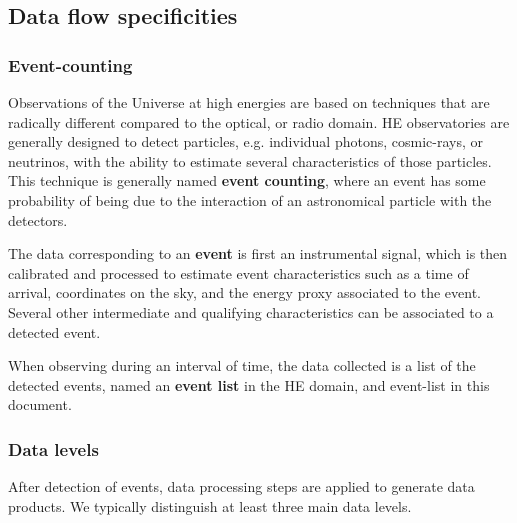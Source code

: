 \documentclass[11pt,a4paper]{ivoa}
\begin{document}
\subsection{Data flow specificities}

\subsubsection{Event-counting}

Observations of the Universe at high energies are based on techniques that are radically different compared to the optical, or radio domain. HE observatories are generally designed to detect particles, e.g. individual photons, cosmic-rays, or neutrinos, with the ability to estimate several characteristics of those particles. This technique is generally named \textbf{event counting}, where an event has some probability of being due to the interaction of an astronomical particle with the detectors.

The data corresponding to an \textbf{event} is first an instrumental signal, which is then calibrated and processed to estimate event characteristics such as a time of arrival, coordinates on the sky, and the energy proxy associated to the event. Several other intermediate and qualifying characteristics can be associated to a detected event.

When observing during an interval of time, the data collected is a list of the detected events, named an \textbf{event list} in the HE domain, and event-list in this document.




\subsubsection{Data levels}

After detection of events, data processing steps are applied to generate data products. We typically distinguish at
least three main data levels.
\end{document}
